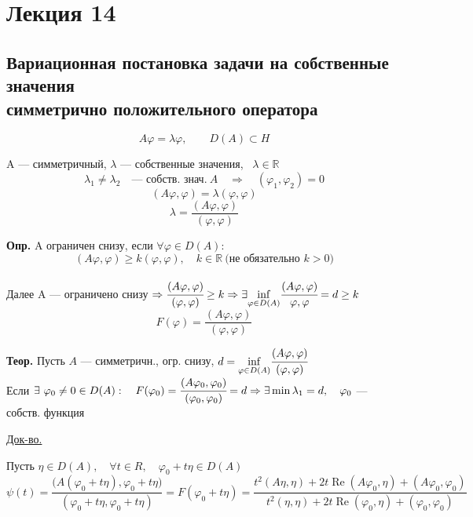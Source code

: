 \documentclass[12pt, a4paper]{article}
\begin{document}
\newpage

\section{Лекция 14}

\subsection{Вариационная постановка задачи на собственные значения \\ симметрично положительного оператора}

\[ A \varphi = \lambda \varphi, \qquad D(A) \subset H \label{14.1} \tag{14.1} \]

A --- симметричный, \qquad $ \lambda $ --- собственные значения, \ $ \lambda \in \mathbb{R} $
\[ \lambda_1 \neq \lambda_2 \quad \text{--- собств. знач.} \ A \quad \Rightarrow \quad (\varphi_1, \varphi_2) = 0\]
\[ (A\varphi, \varphi) = \lambda (\varphi, \varphi) \]
\[ \lambda = \frac{(A\varphi, \varphi)}{(\varphi, \varphi)} \label{eq:14_2} \]

\textbf{Опр.} A ограничен снизу, если $ \forall \varphi \in D(A):$ \\
\[ (A\varphi, \varphi) \geq k(\varphi, \varphi), \quad k \in \mathbb{R} \ \text{(не обязательно $k>0$)} \label{14.2} \tag{14.2} \] \\

Далее A --- ограничено снизу $ \Rightarrow  \cfrac{(A \varphi, \varphi)}{(\varphi, \varphi)} \geq k \Rightarrow \exists \underset{\varphi \in D(A)}{\inf} \cfrac{(A\varphi, \varphi)}{\varphi, \varphi} = d \geq k$
\[ F(\varphi) = \frac{(A \varphi, \varphi)}{(\varphi, \varphi)} \label{14.4} \tag{14.4} \]

\textbf{Теор.} Пусть $ A $ --- симметричн., огр. снизу,  \quad $ d = \underset{\varphi \in D(A)}{\inf} \cfrac{(A \varphi, \varphi)}{(\varphi, \varphi)} $ \\
Если $ \exists \ \varphi_0 \neq 0 \in D(A): \quad F(\varphi_0) = \cfrac{(A \varphi_0, \varphi_0)}{(\varphi_0, \varphi_0)} = d \Rightarrow \exists \min \lambda_1 = d, \quad \varphi_0$ --- собств. функция

\underline{Док-во.}

Пусть $ \eta \in D(A), \quad \forall t \in R, \quad \varphi_0 + t \eta \in D(A) $
\[ \psi(t) = \frac{\bigl( A(\varphi_0 + t \eta), \varphi_0 + t\eta \bigr)}{(\varphi_0 + t \eta, \varphi_0 + t\eta)} = F(\varphi_0 + t \eta) = \frac{t^2(A \eta, \eta) + 2 t \operatorname{Re}(A \varphi_0, \eta) + (A \varphi_0, \varphi_0)}{t^2 (\eta, \eta) + 2t\operatorname{Re}(\varphi_0, \eta) + (\varphi_0, \varphi_0)} \]
\end{document}
